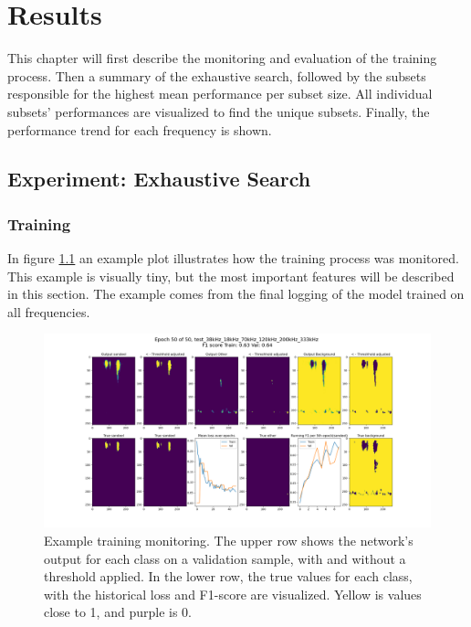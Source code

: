 \chapter{Results} \label{results}
This chapter will first describe the monitoring and evaluation of the training process. Then a summary of the exhaustive search, followed by the subsets responsible for the highest mean performance per subset size. All individual subsets’ performances are visualized to find the unique subsets. Finally, the performance trend for each frequency is shown. 

\section{Experiment: Exhaustive Search}
    
    \subsection{Training}
        In figure \ref{training_overveiw_fig} an example plot illustrates how the training process was monitored. This example is visually tiny, but the most important features will be described in this section. The example comes from the final logging of the model trained on all frequencies.
        \clearpage
        \begin{figure}[H]

            \hspace*{-3.2cm}
            \includegraphics[scale=0.45]{figures/epoch_50_test_38kHz_18kHz_70kHz_120kHz_200kHz_333kHz.png}
            \caption[Training example monitoring]{Example training monitoring. The upper row shows the network's output for each class on a validation sample, with and without a threshold applied. In the lower row, the true values for each class, with the historical loss and F1-score are visualized. Yellow is values close to 1, and purple is 0.}
          	\medskip 
            \label{training_overveiw_fig}
        \end{figure}
        
